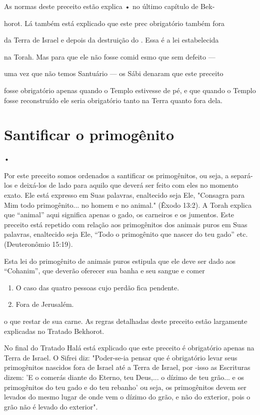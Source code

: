 As normas deste preceito estão explica • no último capítulo de Bek-


horot. Lá também está explicado que este prec obrigatório também fora

da Terra de Israel e depois da destruição do . Essa é a lei estabelecida

na Torah. Mas para que ele não fosse comid esmo que sem defeito ---

uma vez que não temos Santuário --- os Sábi denaram que este preceito

fosse obrigatório apenas quando o Templo estivesse de pé, e que quando o
Tem­plo fosse reconstruído ele seria obrigatório tanto na Terra quanto
fora dela.


\section{Santificar o primogênito}


•

Por este preceito somos ordenados a santificar os primogênitos, ou seja,
a separá-los e deixá-los de lado para aquilo que deverá ser feito com
eles no momento exato. Ele está expresso em Suas palavras, enaltecido
seja Ele, "Con­sagra para Mim todo primogênito... no homem e no animal."
(Êxodo 13:2). A Torah explica que ``animal'' aqui significa apenas o gado,
os carneiros e os ju­mentos. Este preceito está repetido com relação aos
primogênitos dos animais puros em Suas palavras, enaltecido seja Ele,
``Todo o primogênito que nascer do teu gado'' etc. (Deuteronômio 15:19).

Esta lei do primogênito de animais puros estipula que ele deve ser dado
aos ``Cohanim'', que deverão oferecer sua banha e seu sangue e comer


\begin{enumerate}
\def\labelenumi{\arabic{enumi}.}
\setcounter{enumi}{100}
\item
 
 O caso das quatro pessoas cujo perdão fica pendente.
 
\item
 
 Fora de Jerusalém.
 
\end{enumerate}




o que restar de sua carne. As regras detalhadas deste preceito estão
largamente explicadas no Tratado Bekhorot.

No final do Tratado Halá está explicado que este preceito é obriga­tório
apenas na Terra de Israel. O Sifrei diz: "Poder-se-ia pensar que é
obrigató­rio levar seus primogênitos nascidos fora de Israel até a Terra
de Israel, por -isso as Escrituras dizem: 'E o comerás diante do Eterno,
teu Deus,... o dízimo de teu grão... e os primogênitos do teu gado e do
teu rebanho' ou seja, os primo­gênitos devem ser levados do mesmo lugar
de onde vem o dízimo do grão, e não do exterior, pois o grão não é
levado do exterior".

